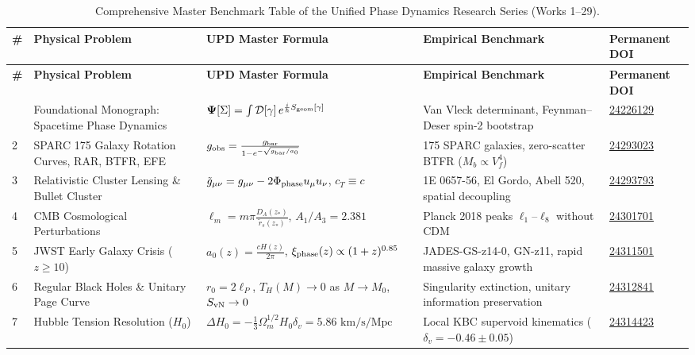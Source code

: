 \documentclass[11pt,a4paper]{article}
\theoremstyle{definition}
\begin{document}
\begin{small}
\begin{longtable}{p{} p{} p{} p{} p{}}
\caption{Comprehensive Master Benchmark Table of the Unified Phase Dynamics Research Series (Works 1--29).}\label{tab:series_master_benchmarks}\\
\toprule
\textbf{\#} & \textbf{Physical Problem} & \textbf{UPD Master Formula} & \textbf{Empirical Benchmark} & \textbf{Permanent DOI} \\
\midrule
\endfirsthead
\toprule
\textbf{\#} & \textbf{Physical Problem} & \textbf{UPD Master Formula} & \textbf{Empirical Benchmark} & \textbf{Permanent DOI} \\
\midrule
\endhead
\bottomrule
\endfoot
1 & Foundational Monograph: Spacetime Phase Dynamics & $\mathbf{\Psi}[\Sigma] = \int \mathcal{D}[\gamma]\, e^{\frac{i}{\hbar}S_{\rm geom}[\gamma]}$ & Van Vleck determinant, Feynman--Deser spin-2 bootstrap & \href{https://doi.org/10.5281/zenodo.24226129}{24226129} \\
2 & SPARC 175 Galaxy Rotation Curves, RAR, BTFR, EFE & $g_{\rm obs} = \frac{g_{\rm bar}}{1 - e^{-\sqrt{g_{\rm bar}/a_0}}}$ & 175 SPARC galaxies, zero-scatter BTFR ($M_b \propto V_f^4$) & \href{https://doi.org/10.5281/zenodo.24293023}{24293023} \\
3 & Relativistic Cluster Lensing \& Bullet Cluster & $\tilde{g}_{\mu\nu} = g_{\mu\nu} - 2\Phi_{\rm phase} u_\mu u_\nu$, $c_T \equiv c$ & 1E 0657-56, El Gordo, Abell 520, spatial decoupling & \href{https://doi.org/10.5281/zenodo.24293793}{24293793} \\
4 & CMB Cosmological Perturbations & $\ell_m = m \pi \frac{D_A(z_*)}{\tilde{r}_s(z_*)}$, $A_1/A_3 = 2.381$ & Planck 2018 peaks $\ell_1$--$\ell_8$ without CDM & \href{https://doi.org/10.5281/zenodo.24301701}{24301701} \\
5 & JWST Early Galaxy Crisis ($z \ge 10$) & $a_0(z) = \frac{c H(z)}{2\pi}$, $\xi_{\rm phase}(z) \propto (1+z)^{0.85}$ & JADES-GS-z14-0, GN-z11, rapid massive galaxy growth & \href{https://doi.org/10.5281/zenodo.24311501}{24311501} \\
6 & Regular Black Holes \& Unitary Page Curve & $r_0 = 2\ell_P$, $T_H(M) \to 0$ as $M \to M_0$, $S_{\rm vN} \to 0$ & Singularity extinction, unitary information preservation & \href{https://doi.org/10.5281/zenodo.24312841}{24312841} \\
7 & Hubble Tension Resolution ($H_0$) & $\Delta H_0 = - \frac{1}{3} \Omega_m^{1/2} H_0 \delta_v = 5.86\text{ km/s/Mpc}$ & Local KBC supervoid kinematics ($\delta_v = -0.46 \pm 0.05$) & \href{https://doi.org/10.5281/zenodo.24314423}{24314423} \\

\end{longtable}
\end{small}
\end{document}
